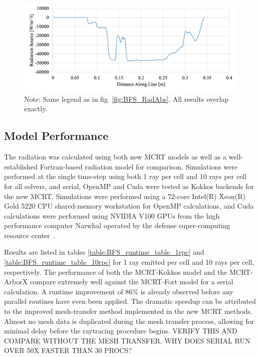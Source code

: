 \begin{figure}[!ht]
\includegraphics[width=\linewidth]{figures/ch4/LineComparison_RadSrc.png}
\caption{Note: Same legend as in fig. \ref{fig:BFS_RadAbs}. All results overlap exactly.}
\label{fig:BFS_RadSrc}
\end{figure}


\subsection{Model Performance}
The radiation was calculated using both new MCRT models as well as a well-established Fortran-based radiation model for comparison. Simulations were performed at the single time-step using both 1 ray per cell and 10 rays per cell for all solvers, and serial, OpenMP and Cuda were tested as Kokkos backends for the new MCRT. 
Simulations were performed using a 72-core Intel(R) Xeon(R) Gold 5220 CPU shared-memory workstation for OpenMP calculations, and Cuda calculations were performed using NVIDIA V100 GPUs from the high performance computer Narwhal operated by the defense super-computing resource center~\cite{something}.

Results are listed in tables \ref{table:BFS_runtime_table_1rpc} and \ref{table:BFS_runtime_table_10rpc} for 1 ray emitted per cell and 10 rays per cell, respectively. The performance of both the MCRT-Kokkos model and the MCRT-ArborX compare extremely well against the MCRT-Fort model for a serial calculation. A runtime improvement of 86\% is already observed before any parallel routines have even been applied.
The dramatic speedup can be attributed to the improved mesh-transfer method implemented in the new MCRT methods. 
Almost no mesh data is duplicated during the mesh transfer process, allowing for minimal delay before the raytracing procedure begins. VERIFY THIS AND COMPARE WITHOUT THE MESH TRANSFER. WHY DOES SERIAL RUN OVER 50X FASTER THAN 30 PROCS?

